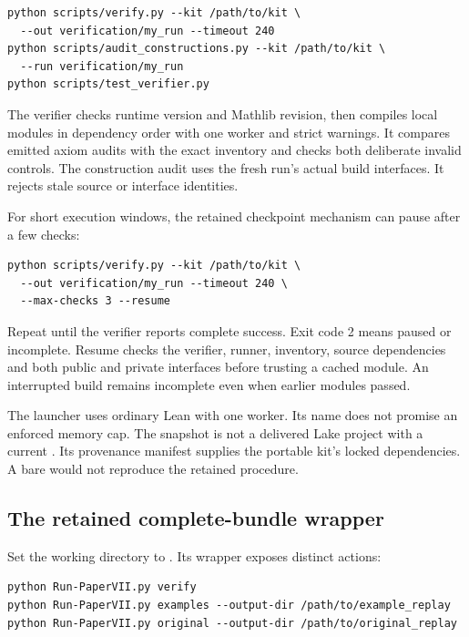 \begin{Verbatim}[fontsize=\small,breaklines=true,breakanywhere=true]
python scripts/verify.py --kit /path/to/kit \
  --out verification/my_run --timeout 240
python scripts/audit_constructions.py --kit /path/to/kit \
  --run verification/my_run
python scripts/test_verifier.py
\end{Verbatim}

The verifier checks runtime version and Mathlib revision, then compiles local modules in dependency order with one worker and strict warnings. It compares emitted axiom audits with the exact inventory and checks both deliberate invalid controls. The construction audit uses the fresh run's actual build interfaces. It rejects stale source or interface identities.

For short execution windows, the retained checkpoint mechanism can pause after a few checks:

\begin{Verbatim}[fontsize=\small,breaklines=true,breakanywhere=true]
python scripts/verify.py --kit /path/to/kit \
  --out verification/my_run --timeout 240 \
  --max-checks 3 --resume
\end{Verbatim}

Repeat until the verifier reports complete success. Exit code 2 means paused or incomplete. Resume checks the verifier, runner, inventory, source dependencies and both public and private interfaces before trusting a cached module. An interrupted build remains incomplete even when earlier modules passed.

The  launcher uses ordinary Lean with one worker. Its name does not promise an enforced memory cap. The snapshot is not a delivered Lake project with a current . Its provenance manifest supplies the portable kit's locked dependencies. A bare  would not reproduce the retained procedure.

\subsection{The retained complete-bundle wrapper}
Set the working directory to . Its wrapper exposes distinct actions:

\begin{Verbatim}[fontsize=\small,breaklines=true,breakanywhere=true]
python Run-PaperVII.py verify
python Run-PaperVII.py examples --output-dir /path/to/example_replay
python Run-PaperVII.py original --output-dir /path/to/original_replay
\end{Verbatim}

